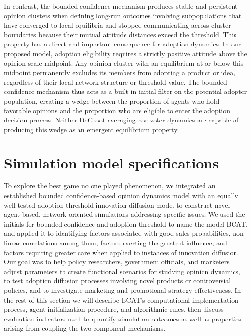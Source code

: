 \documentclass[10pt,letterpaper]{article}
\begin{document}
In contrast, the bounded confidence mechanism produces stable and persistent opinion clusters when defining long-run outcomes involving subpopulations that have converged to local equilibria and stopped communicating across cluster boundaries because their mutual attitude distances exceed the threshold. This property has a direct and important consequence for adoption dynamics. In our proposed model, adoption eligibility requires a strictly positive attitude above the opinion scale midpoint. Any opinion cluster with an equilibrium at or below this midpoint permanently excludes its members from adopting a product or idea, regardless of their local network structure or threshold value. The bounded confidence mechanism thus acts as a built-in initial filter on the potential adopter population, creating a wedge between the proportion of agents who hold favorable opinions and the proportion who are eligible to enter the adoption decision process. Neither DeGroot averaging nor voter dynamics are capable of producing this wedge as an emergent equilibrium property.


\section*{Simulation model specifications}

To explore the best game no one played phenomenon, we integrated an established bounded confidence-based opinion dynamics model with an equally well-tested adoption threshold innovation diffusion model to construct novel agent-based, network-oriented simulations addressing specific issues. We used the initials for bounded confidence and adoption threshold to name the model BCAT, and applied it to identifying factors associated with good sales probabilities, non-linear correlations among them, factors exerting the greatest influence, and factors requiring greater care when applied to instances of innovation diffusion. Our goal was to help policy researchers, government officials, and marketers adjust parameters to create functional scenarios for studying opinion dynamics, to test adoption diffusion processes involving novel products or controversial policies, and to investigate marketing and promotional strategy effectiveness. In the rest of this section we will describe BCAT's computational implementation process, agent initialization procedure, and algorithmic rules, then discuss evaluation indicators used to quantify simulation outcomes as well as properties arising from coupling the two component mechanisms.
\end{document}
